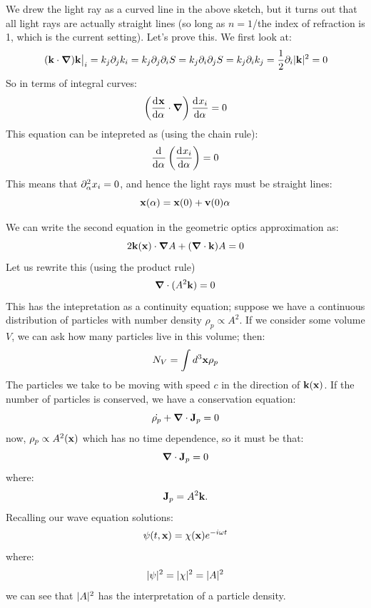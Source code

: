 We drew the light ray as a curved line in the above sketch, but it turns out that all light rays are actually straight lines (so long as $n = 1$/the index of refraction is 1, which is the current setting). Let's prove this. We first look at:
\begin{equation}
    \left.(\v{k} \cdot \nabla)\v{k}\right|_i = k_j \p_j k_i = k_j \p_j \p_i S = k_j \p_i \p_j S = k_j \p_i k_j = \frac{1}{2}\p_i \abs{\v{k}}^2 = 0
\end{equation}
So in terms of integral curves:
\begin{equation}
    \left(\dod{\v{x}}{\alpha}\cdot\nabla\right)\dod{x_i}{\alpha} = 0
\end{equation}
This equation can be intepreted as (using the chain rule):
\begin{equation}
    \dod{}{\alpha} \left(\dod{x_i}{\alpha}\right) = 0
\end{equation}
This means that $\partial_\alpha^2 x_i = 0$, and hence the light rays must be straight lines:
\begin{equation}
    \mathbf{x}(\alpha) = \mathbf{x}(0) + \mathbf{v}(0)\alpha
\end{equation}

We can write the second equation in the geometric optics approximation as:
\begin{equation}
    2\v{k}(\v{x}) \cdot \nabla A + (\nabla \cdot \v{k})A = 0
\end{equation}
Let us rewrite this (using the product rule)
\begin{equation}
    \nabla \cdot (A^2\v{k}) = 0
\end{equation}
This has the intepretation as a continuity equation; suppose we have a continuous distribution of particles with number density $\rho_p \propto A^2$. If we consider some volume $V$, we can ask how many particles live in this volume; then:
\begin{equation}
    N_V = \int d^3\mathbf{x} \rho_p
\end{equation}
The particles we take to be moving with speed $c$ in the direction of $\mathbf{k}(\mathbf{x})$. If the number of particles is conserved, we have a conservation equation:
\begin{equation}
    \dot{\rho_p} + \nabla \cdot \v{J}_p = 0
\end{equation}
now, $\rho_p \propto A^2(\mathbf{x})$ which has no time dependence, so it must be that:
\begin{equation}
    \nabla \cdot \v{J}_p = 0
\end{equation}
where:
\begin{equation}
    \mathbf{J}_p = A^2\mathbf{k}.
\end{equation}
Recalling our wave equation solutions:
\begin{equation}
    \psi(t, \mathbf{x}) = \chi(\mathbf{x})e^{-i\omega t}
\end{equation}
where:
\begin{equation}
    \lvert \psi \rvert^2 = \lvert \chi \rvert^2 = \lvert A \rvert^2
\end{equation}
we can see that $\lvert A \rvert^2$ has the interpretation of a particle density.

